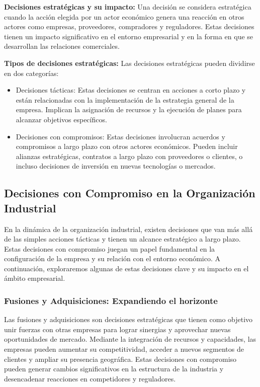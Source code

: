 \documentclass[
  a4paper,
]{article}
\begin{document}
\textbf{Decisiones estratégicas y su impacto:} Una decisión se considera
estratégica cuando la acción elegida por un actor económico genera una
reacción en otros actores como empresas, proveedores, compradores y
reguladores. Estas decisiones tienen un impacto significativo en el
entorno empresarial y en la forma en que se desarrollan las relaciones
comerciales.

\textbf{Tipos de decisiones estratégicas:} Las decisiones estratégicas
pueden dividirse en dos categorías:

\begin{itemize}
\item
  Decisiones tácticas: Estas decisiones se centran en acciones a corto
  plazo y están relacionadas con la implementación de la estrategia
  general de la empresa. Implican la asignación de recursos y la
  ejecución de planes para alcanzar objetivos específicos.
\item
  Decisiones con compromisos: Estas decisiones involucran acuerdos y
  compromisos a largo plazo con otros actores económicos. Pueden incluir
  alianzas estratégicas, contratos a largo plazo con proveedores o
  clientes, o incluso decisiones de inversión en nuevas tecnologías o
  mercados.
\end{itemize}

\hypertarget{decisiones-con-compromiso-en-la-organizaciuxf3n-industrial}{%
\subsection{Decisiones con Compromiso en la Organización
Industrial}\label{decisiones-con-compromiso-en-la-organizaciuxf3n-industrial}}

En la dinámica de la organización industrial, existen decisiones que van
más allá de las simples acciones tácticas y tienen un alcance
estratégico a largo plazo. Estas decisiones con compromiso juegan un
papel fundamental en la configuración de la empresa y su relación con el
entorno económico. A continuación, exploraremos algunas de estas
decisiones clave y su impacto en el ámbito empresarial.

\hypertarget{fusiones-y-adquisiciones-expandiendo-el-horizonte}{%
\subsubsection{Fusiones y Adquisiciones: Expandiendo el
horizonte}\label{fusiones-y-adquisiciones-expandiendo-el-horizonte}}

Las fusiones y adquisiciones son decisiones estratégicas que tienen como
objetivo unir fuerzas con otras empresas para lograr sinergias y
aprovechar nuevas oportunidades de mercado. Mediante la integración de
recursos y capacidades, las empresas pueden aumentar su competitividad,
acceder a nuevos segmentos de clientes y ampliar su presencia
geográfica. Estas decisiones con compromiso pueden generar cambios
significativos en la estructura de la industria y desencadenar
reacciones en competidores y reguladores.
\end{document}
